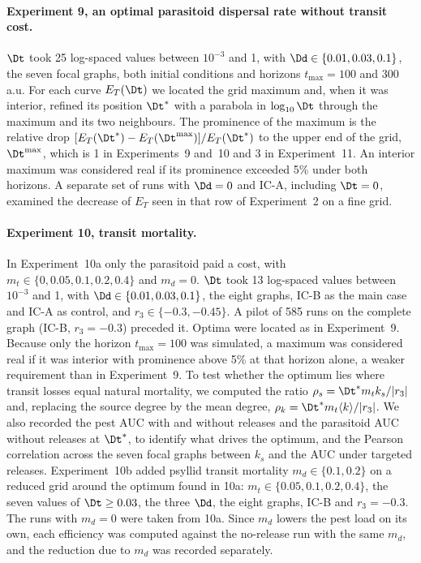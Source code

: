 \paragraph{Experiment 9, an optimal parasitoid dispersal rate without transit cost.} $\Dt$ took 25 log-spaced values between $10^{-3}$ and 1, with $\Dd \in \{0.01, 0.03, 0.1\}$, the seven focal graphs, both initial conditions and horizons $t_{\max} = 100$ and 300 a.u. For each curve $E_T(\Dt)$ we located the grid maximum and, when it was interior, refined its position $\Dt^*$ with a parabola in $\log_{10}\Dt$ through the maximum and its two neighbours. The prominence of the maximum is the relative drop $[E_T(\Dt^*) - E_T(\Dt^{\max})]/E_T(\Dt^*)$ to the upper end of the grid, $\Dt^{\max}$, which is 1 in Experiments~9 and~10 and 3 in Experiment~11. An interior maximum was considered real if its prominence exceeded 5\% under both horizons. A separate set of runs with $\Dd = 0$ and IC-A, including $\Dt = 0$, examined the decrease of $E_T$ seen in that row of Experiment~2 on a fine grid.

\paragraph{Experiment 10, transit mortality.} In Experiment~10a only the parasitoid paid a cost, with $m_t \in \{0, 0.05, 0.1, 0.2, 0.4\}$ and $m_d = 0$. $\Dt$ took 13 log-spaced values between $10^{-3}$ and 1, with $\Dd \in \{0.01, 0.03, 0.1\}$, the eight graphs, IC-B as the main case and IC-A as control, and $r_3 \in \{-0.3, -0.45\}$. A pilot of 585 runs on the complete graph (IC-B, $r_3 = -0.3$) preceded it. Optima were located as in Experiment~9. Because only the horizon $t_{\max} = 100$ was simulated, a maximum was considered real if it was interior with prominence above 5\% at that horizon alone, a weaker requirement than in Experiment~9. To test whether the optimum lies where transit losses equal natural mortality, we computed the ratio $\rho_s = \Dt^* m_t k_s/|r_3|$ and, replacing the source degree by the mean degree, $\rho_k = \Dt^* m_t \langle k\rangle/|r_3|$. We also recorded the pest AUC with and without releases and the parasitoid AUC without releases at $\Dt^*$, to identify what drives the optimum, and the Pearson correlation across the seven focal graphs between $k_s$ and the AUC under targeted releases. Experiment~10b added psyllid transit mortality $m_d \in \{0.1, 0.2\}$ on a reduced grid around the optimum found in 10a: $m_t \in \{0.05, 0.1, 0.2, 0.4\}$, the seven values of $\Dt \geq 0.03$, the three $\Dd$, the eight graphs, IC-B and $r_3 = -0.3$. The runs with $m_d = 0$ were taken from 10a. Since $m_d$ lowers the pest load on its own, each efficiency was computed against the no-release run with the same $m_d$, and the reduction due to $m_d$ was recorded separately.

